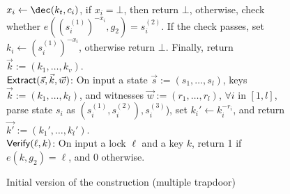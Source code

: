 \begin{figure}[htb]
{{			$x_i \gets \dec(k_t, c_i)$, if $x_i = \bot$, then return $\bot$, otherwise, 
			check whether $e((s_i^{(1)})^{-x_i},g_2) = s_i^{(2)}$. If the check passes, set 
			$k_i \gets (s_i^{(1)})^{-x_i}$, otherwise return $\bot$. Finally, return $\vec{k} := 
			(k_1,\ldots,k_v)$. \\
			\underline{$\mathsf{Extract}(\vec{s}, \vec{k}, \vec{w})$}: On input a state $\vec{s} := 
			(s_1,\ldots,s_l)$, keys $\vec{k} := (k_1,\ldots,k_l)$, and witnesses 
			$\vec{w} := (r_1,\ldots,r_l)$, $\forall i$ in $[1,l]$, parse state $s_i$ as 
			$(s_i^{(1)}, s_i^{(2)}), s_i^{(3)}$), set $k_i' \gets k_i^{-r_i}$, and return 
			$\vec{k'} := (k_1',\ldots,k_l')$. \\
			\underline{$\mathsf{Verify}(\ell, k)$}: On input a lock $\ell$ and a key $k$, return 1 
			if $e(k, g_2) = \ell$, and 0 otherwise.
		}
	}
	\caption{Initial version of the construction (multiple trapdoor)}
\end{figure}
